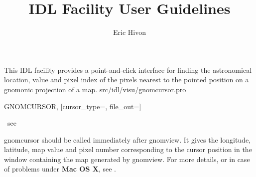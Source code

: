 




\sloppy



\title{\healpix IDL Facility User Guidelines}
 \section[gnomcursor]{ }
\label{idl:\thedocid}
\author{Eric Hivon}


\begin{facility}
{This IDL facility provides a point-and-click interface for finding
the astronomical location, value and pixel index of the pixels nearest 
to the pointed position on a gnomonic projection of a \healpix map.}
{src/idl/visu/gnomcursor.pro}
\end{facility}

\begin{IDLformat}
{GNOMCURSOR, [cursor\_type=, file\_out=]}
\end{IDLformat}

\begin{qualifiers}
\hbox{\hspace{5cm}		see }
\end{qualifiers}


\begin{codedescription}
{gnomcursor should be called immediately after gnomview. It gives the longitude,
latitude, map value and pixel number
corresponding to the cursor position in the window containing the map generated
by gnomview. For more details, or in case
of problems under {\bf Mac OS X}, see .}
\end{codedescription}



